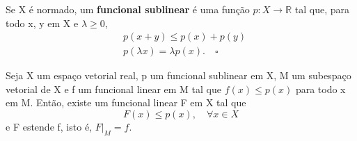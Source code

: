 \documentclass[../functional_analysis.tex]{subfiles}
\begin{document}
\begin{def*}
	Se X é normado, um \textbf{funcional sublinear} é uma função \(p:X\rightarrow \mathbb{R}\) tal que, para todo x, y em X e \(\lambda \geq 0\),
	\begin{align*}
		 & p(x+y)\leq p(x)+p(y)                      \\
		 & p(\lambda x) = \lambda p(x).\quad \square
	\end{align*}
\end{def*}
\hypertarget{hahn_banach}{
	\begin{theorem*}
		Seja X um espaço vetorial real, p um funcional sublinear em X, M um subespaço vetorial de X e f um funcional linear em M tal que \(f(x)\leq p(x)\) para todo x em M. Então, existe um funcional linear F em X tal que
		\[
			F(x)\leq p(x),\quad \forall x\in X
		\]
		e F estende f, isto é, \(F|_{M}=f.\)
	\end{theorem*}}
\end{document}
